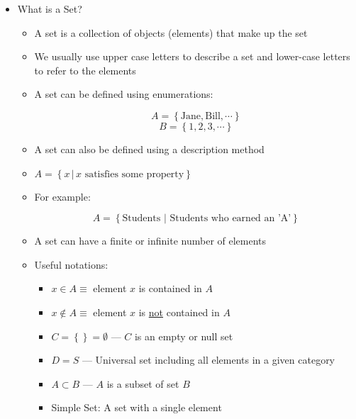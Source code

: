 \begin{itemize}

  \item What is a Set?

    \begin{itemize}

      \item A set is a collection of objects (elements) that make up the set

      \item We usually use upper case letters to describe a set and lower-case letters to refer to the elements

      \item A set can be defined using enumerations:

        $$A=\left\{ \text{Jane}, \text{Bill},\cdots \right\}$$
        $$B=\left\{ 1,2,3,\cdots \right\}$$

      \item A set can also be defined using a description method

      \item $A=\left\{ x\,|\,x\text{ satisfies some property} \right\}$

      \item For example:

        $$A=\left\{ \text{Students } | \text{ Students who earned an 'A'} \right\}$$

      \item A set can have a finite or infinite number of elements

      \item Useful notations:

        \begin{itemize}

          \item $x\in A \equiv$ element $x$ is contained in $A$

          \item $x\notin A \equiv$ element $x$ is \underline{not} contained in $A$

          \item $C=\left\{  \right\}=\emptyset$ — $C$ is an empty or null set

          \item $D=S$ — Universal set including all elements in a given category

          \item $A\subset B$ — $A$ is a subset of set $B$

          \item Simple Set: A set with a single element
            

\end{itemize}
\end{itemize}
\end{itemize}
